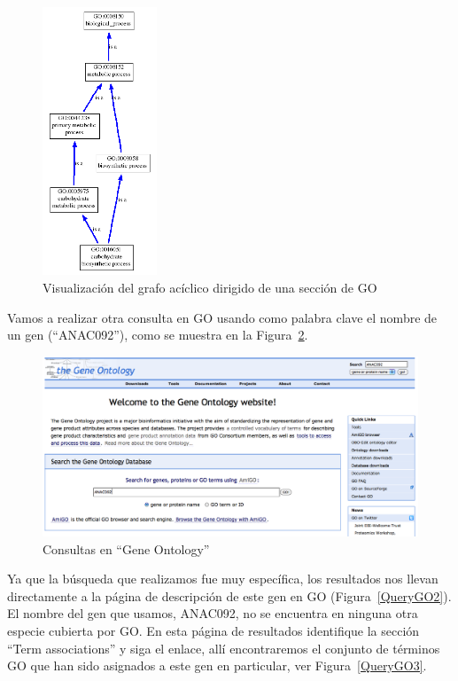 \documentclass[letter,11pt]{book}
\begin{document}
\begin{figure}[ht]
\centering
   \includegraphics[height=8cm]{Figs/GO_DAG.png}
  \caption{\label{GO_DAG}Visualización del grafo acíclico dirigido de una sección de GO}
\end{figure}


Vamos a realizar otra consulta en GO usando como palabra clave el nombre de un gen (``ANAC092''), como se muestra en la Figura~\ref{QueryGO}.

\begin{figure}[ht]
\centering
   \includegraphics[width=15cm]{Figs/QueryGO1.png}
  \caption{\label{QueryGO}Consultas en ``Gene Ontology''}
\end{figure}

Ya que la búsqueda que realizamos fue muy específica, los resultados nos llevan directamente a la página de descripción de este gen en GO (Figura~\ref{QueryGO2}). El nombre del gen que usamos, ANAC092, no se encuentra en ninguna otra especie cubierta por GO. En esta página de resultados identifique la sección ``Term associations'' y siga el enlace, allí encontraremos el conjunto de términos GO que han sido asignados a este gen en particular, ver Figura~\ref{QueryGO3}.
\end{document}
